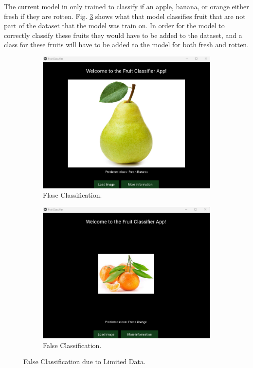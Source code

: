 \documentclass[conference]{IEEEtran}
\begin{document}
The current model in only trained to classify if an apple, banana, or orange either fresh if they are rotten. Fig. \ref{FigLimData} shows what that model classifies fruit that are not part of the dataset that the model was train on. In order for the model to correctly classify these fruits they would have to be added to the dataset, and a class for these fruits will have to be added to the model for both fresh and rotten.

\begin{figure}[h]
    \centering
    \begin{subfigure}[b]{0.48\linewidth}
        \centering
        \includegraphics[width=\linewidth]{Pear not in dataset.png}
        \caption{Flase Classification.}
        \label{figFA}
    \end{subfigure}
    \hfill
    \begin{subfigure}[b]{0.48\linewidth}
        \centering
        \includegraphics[width=\linewidth]{Tangerine not in dataset.png}
        \caption{False Classification.}
        \label{figFB}
    \end{subfigure}
    \caption{False Classification due to Limited Data.}
    \label{FigLimData}
\end{figure}
\end{document}

